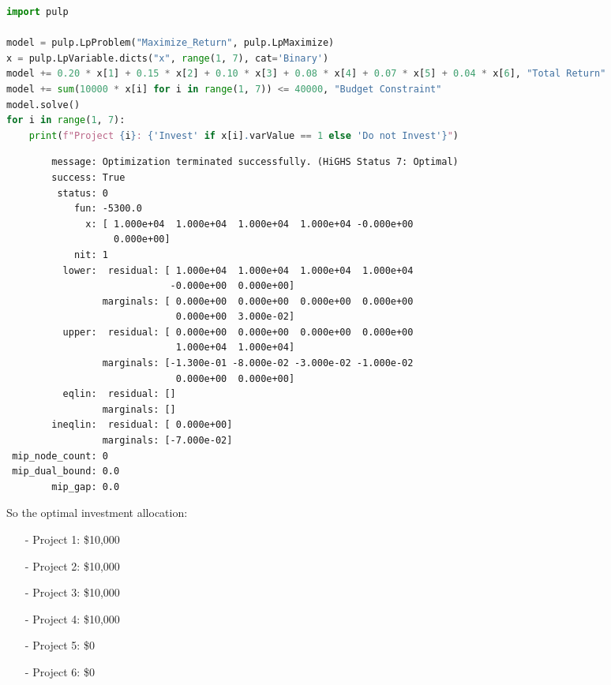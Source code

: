 \documentclass[12pt]{article}
\begin{document}
\begin{multicols}{2}
\begin{lstlisting}[language=Python]
import pulp

model = pulp.LpProblem("Maximize_Return", pulp.LpMaximize)
x = pulp.LpVariable.dicts("x", range(1, 7), cat='Binary')
model += 0.20 * x[1] + 0.15 * x[2] + 0.10 * x[3] + 0.08 * x[4] + 0.07 * x[5] + 0.04 * x[6], "Total Return"
model += sum(10000 * x[i] for i in range(1, 7)) <= 40000, "Budget Constraint"
model.solve()
for i in range(1, 7):
    print(f"Project {i}: {'Invest' if x[i].varValue == 1 else 'Do not Invest'}")
\end{lstlisting}
\end{multicols}
{\scriptsize
 \begin{verbatim}
        message: Optimization terminated successfully. (HiGHS Status 7: Optimal)
        success: True
         status: 0
            fun: -5300.0
              x: [ 1.000e+04  1.000e+04  1.000e+04  1.000e+04 -0.000e+00
                   0.000e+00]
            nit: 1
          lower:  residual: [ 1.000e+04  1.000e+04  1.000e+04  1.000e+04
                             -0.000e+00  0.000e+00]
                 marginals: [ 0.000e+00  0.000e+00  0.000e+00  0.000e+00
                              0.000e+00  3.000e-02]
          upper:  residual: [ 0.000e+00  0.000e+00  0.000e+00  0.000e+00
                              1.000e+04  1.000e+04]
                 marginals: [-1.300e-01 -8.000e-02 -3.000e-02 -1.000e-02
                              0.000e+00  0.000e+00]
          eqlin:  residual: []
                 marginals: []
        ineqlin:  residual: [ 0.000e+00]
                 marginals: [-7.000e-02]
 mip_node_count: 0
 mip_dual_bound: 0.0
        mip_gap: 0.0
    \end{verbatim}
}

So the optimal investment allocation:
\begin{itemize}
\item[-]  Project 1: \$10,000
\item[-] Project 2: \$10,000
\item[-] Project 3: \$10,000
\item[-] Project 4: \$10,000
\item[-] Project 5: \$0
\item[-] Project 6: \$0
\end{itemize}
\end{document}
